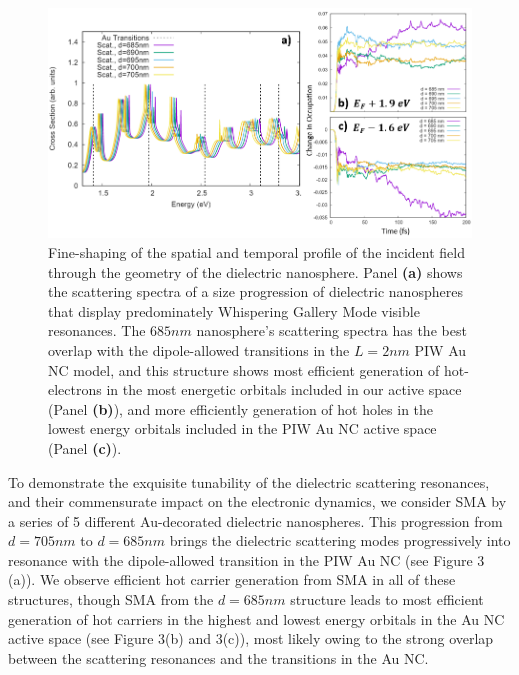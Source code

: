 \documentclass[journal=jpclcd,manuscript=article]{achemso}
\begin{document}
\begin{figure}
\begin{center}
\includegraphics[width=6in]{Au_WGM_Spectrum_and_Trajectories.png}
\caption{Fine-shaping of the spatial and temporal profile of the incident field
through the geometry of the dielectric nanosphere.  Panel {\bf (a)} shows
the scattering spectra of a size progression of dielectric nanospheres that display
predominately Whispering Gallery Mode visible resonances.  The
$685nm$ nanosphere's scattering spectra has the best overlap with the dipole-allowed
transitions in the $L=2nm$ PIW Au NC model, and this structure shows most efficient
generation of hot-electrons in the most energetic orbitals included in our
active space (Panel {\bf (b)}), and more efficiently generation of
hot holes in the lowest energy orbitals included in the PIW Au NC active space (Panel
{\bf (c)}).   }
\end{center}
\end{figure}

To demonstrate the exquisite tunability of the dielectric scattering resonances, and their 
commensurate impact on the electronic dynamics, we consider SMA by a series of 5 different Au-decorated dielectric
nanospheres.  This progression from $d=705 nm$ to $d=685 nm$ brings the dielectric scattering modes progressively 
into resonance with the dipole-allowed transition in the PIW Au NC (see Figure 3 (a)).  We observe efficient hot carrier
generation from SMA in all of these structures, though SMA from the $d=685 nm$ structure leads to most efficient generation
of hot carriers in the highest and lowest energy orbitals in the Au NC active space (see Figure 3(b) and 3(c)), 
most likely owing to the strong overlap between the scattering resonances and the transitions in the Au NC.  
\end{document}
